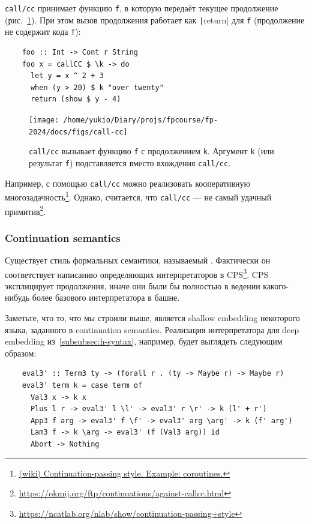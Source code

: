 \texttt{call/cc} принимает функцию \texttt{f}, в которую передаёт текущее продолжение (рис.~\ref{fig:call-cc}).
При этом вызов продолжения работает как \texttt|return| для \texttt{f} (продолжение не содержит кода \texttt{f}):
\begin{verbatim}
    foo :: Int -> Cont r String
    foo x = callCC $ \k -> do
      let y = x ^ 2 + 3
      when (y > 20) $ k "over twenty"
      return (show $ y - 4)
\end{verbatim}

\begin{figure}[h]
    \centering
    \texttt{[image: /home/yukio/Diary/projs/fpcourse/fp-2024/docs/figs/call-cc]}
    \caption{\texttt{call/cc} вызывает функцию \texttt{f} с продолжением \texttt{k}.
    Аргумент \texttt{k} (или результат \texttt{f}) подставляется вместо вхождения \texttt{call/cc}.}
    \label{fig:call-cc}
\end{figure}

Например, с помощью \texttt{call/cc} можно реализовать кооперативную многозадачность\footnote{\href{https://en.wikibooks.org/wiki/Haskell/Continuation_passing_style\#Example:_coroutines}{(wiki) Continuation-passing style.
Example: coroutines.}}.
Однако, считается, что \texttt{call/cc} --- не самый удачный примитив\footnote{\url{https://okmij.org/ftp/continuations/against-callcc.html}}.

\subsubsection{Continuation semantics}

Существует стиль формальных семантики, называемый .
Фактически он соответствует написанию определяющих интерпретаторов в CPS\footnote{\url{https://ncatlab.org/nlab/show/continuation-passing+style}}.
CPS эксплицирует продолжения, иначе они были бы полностью в ведении какого-нибудь более базового интерпретатора в башне.

Заметьте, что то, что мы строили выше, является shallow embedding некоторого языка, заданного в continuation semantics.
Реализация интерпретатора для deep embedding из~\ref{subsubsec:h-syntax}, например, будет выглядеть следующим образом:
\begin{verbatim}
    eval3' :: Term3 ty -> (forall r . (ty -> Maybe r) -> Maybe r)
    eval3' term k = case term of
      Val3 x -> k x
      Plus l r -> eval3' l \l' -> eval3' r \r' -> k (l' + r')
      App3 f arg -> eval3' f \f' -> eval3' arg \arg' -> k (f' arg')
      Lam3 f -> k \arg -> eval3' (f (Val3 arg)) id
      Abort -> Nothing
\end{verbatim}

